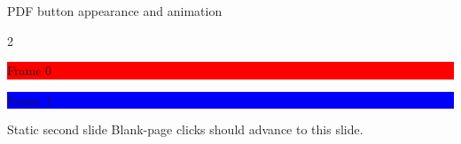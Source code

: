 \documentclass[aspectratio=169]{beamer}
\begin{document}
\begin{frame}{PDF button appearance and animation}
\centering
\begin{animateinline}[method=icon,controls,loop,poster=first]{2}
\colorbox{red}{\parbox[c][2cm][c]{6cm}{\centering\color{white}\Huge Frame 0}}
\newframe
\colorbox{blue}{\parbox[c][2cm][c]{6cm}{\centering\color{white}\Huge Frame 1}}
\end{animateinline}
\end{frame}
\begin{frame}{Static second slide}
\centering
Blank-page clicks should advance to this slide.
\end{frame}
\end{document}
